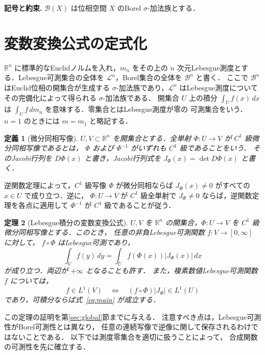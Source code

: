 \documentclass[a5paper,10pt,onecolumn]{jsarticle}
\theoremstyle{mathnotetheorem}
\newtheorem{theorem}{定理}[section]
\newtheorem{definition}[theorem]{定義}
\newcommand{\R}{\mathbb{R}}
\newcommand{\abs}[1]{\lvert #1\rvert}
\begin{document}
\par\noindent\textbf{記号と約束.}\quad
$\mathcal B(X)$ は位相空間 $X$ のBorel $\sigma$-加法族とする．
\par

\section{変数変換公式の定式化}

$\R^n$ に標準的なEuclidノルムを入れ，$m_n$ をその上の
$n$ 次元Lebesgue測度とする．Lebesgue可測集合の全体を
$\mathcal L^n$，Borel集合の全体を $\mathcal B^n$ と書く．
ここで $\mathcal B^n$ はEuclid位相の開集合が生成する
$\sigma$-加法族であり，$\mathcal L^n$ はLebesgue測度について
その完備化によって得られる $\sigma$-加法族である．
開集合 $U$ 上の積分 $\int_U f(x)\,dx$ は
$\int_U f\,dm_n$ を意味する．零集合とはLebesgue測度が零の
可測集合をいう．$n=1$ のときには $m=m_1$ と略記する．

\begin{definition}[微分同相写像]
$U,V\subset\R^n$ を開集合とする．全単射
$\Phi:U\to V$ が $C^1$ 級微分同相写像であるとは，
$\Phi$ および $\Phi^{-1}$ がいずれも $C^1$ 級であることをいう．
そのJacobi行列を $D\Phi(x)$ と書き，Jacobi行列式を
$J_\Phi(x)=\det D\Phi(x)$ と書く．
\end{definition}

逆関数定理によって，$C^1$ 級写像 $\Phi$ が微分同相ならば
$J_\Phi(x)\ne0$ がすべての $x\in U$ で成り立つ．逆に，
$\Phi:U\to V$ が $C^1$ 級全単射で
$J_\Phi\ne0$ ならば，逆関数定理を各点に適用して
$\Phi^{-1}$ が $C^1$ 級であることが従う．

\begin{theorem}[Lebesgue積分の変数変換公式]\label{thm:main}
$U,V$ を $\R^n$ の開集合，$\Phi:U\to V$ を
$C^1$ 級微分同相写像とする．このとき，
任意の非負Lebesgue可測関数 $f:V\to[0,\infty]$ に対して，
$f\circ\Phi$ はLebesgue可測であり，
\begin{equation}\label{eq:main}
 \int_V f(y)\,dy
 =\int_U f(\Phi(x))\abs{J_\Phi(x)}\,dx
\end{equation}
が成り立つ．両辺が $+\infty$ となることも許す．
また，複素数値Lebesgue可測関数 $f$ については，
\[
 f\in L^1(V)
 \quad\Longleftrightarrow\quad
 (f\circ\Phi)\abs{J_\Phi}\in L^1(U)
\]
であり，可積分ならば式~\eqref{eq:main} が成立する．
\end{theorem}

この定理の証明を第\ref{sec:global}節までに与える．
注意すべき点は，Lebesgue可測性がBorel可測性とは異なり，
任意の連続写像で逆像に関して保存されるわけではないことである．
以下では測度零集合を適切に扱うことによって，
合成関数の可測性を先に確立する．
\end{document}

